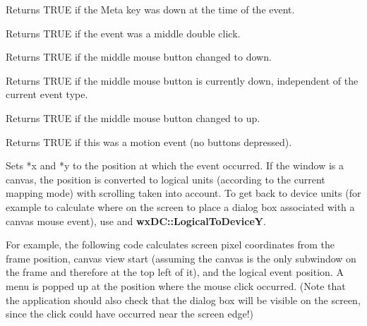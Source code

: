 
Returns TRUE if the Meta key was down at the time of the event.



Returns TRUE if the event was a middle double click.



Returns TRUE if the middle mouse button changed to down.



Returns TRUE if the middle mouse button is currently down, independent
of the current event type.



Returns TRUE if the middle mouse button changed to up.



Returns TRUE if this was a motion event (no buttons depressed).



Sets *x and *y to the position at which the event occurred. If the
window is a canvas, the position is converted to logical units
(according to the current mapping mode) with scrolling taken into
account. To get back to device units (for example to calculate where on the
screen to place a dialog box associated with a canvas mouse event), use
 and {\bf wxDC::LogicalToDeviceY}.

For example, the following code calculates screen pixel coordinates
from the frame position, canvas view start (assuming the canvas is the only
subwindow on the frame and therefore at the top left of it), and the
logical event position. A menu is popped up at the position where the
mouse click occurred. (Note that the application should also check that
the dialog box will be visible on the screen, since the click could have
occurred near the screen edge!)

